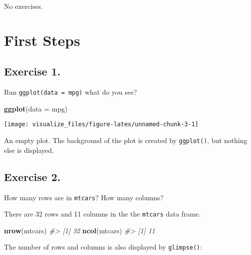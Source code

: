 \documentclass[]{book}
\newenvironment{Shaded}{\begin{snugshade}}{\end{snugshade}}
\newcommand{\CommentTok}[1]{\textcolor[rgb]{0.56,0.35,0.01}{\textit{#1}}}
\newcommand{\DataTypeTok}[1]{\textcolor[rgb]{0.13,0.29,0.53}{#1}}
\newcommand{\KeywordTok}[1]{\textcolor[rgb]{0.13,0.29,0.53}{\textbf{#1}}}
\newcommand{\NormalTok}[1]{#1}
\theoremstyle{definition}
\theoremstyle{definition}
\theoremstyle{definition}
\theoremstyle{remark}
\begin{document}
No exercises.

\hypertarget{first-steps}{%
\section{First Steps}\label{first-steps}}

\hypertarget{exercise-1.}{%
\subsection{Exercise 1.}\label{exercise-1.}}

Run \texttt{ggplot(data\ =\ mpg)} what do you see?

\begin{Shaded}
\begin{Highlighting}[]
\KeywordTok{ggplot}\NormalTok{(}\DataTypeTok{data =}\NormalTok{ mpg)}
\end{Highlighting}
\end{Shaded}

\begin{center}\texttt{[image: visualize\_files/figure-latex/unnamed-chunk-3-1]} \end{center}

An empty plot. The background of the plot is created by
\texttt{ggplot()}, but nothing else is displayed.

\hypertarget{exercise-2.}{%
\subsection{Exercise 2.}\label{exercise-2.}}

How many rows are in \texttt{mtcars}? How many columns?

There are 32 rows and 11 columns in the the \texttt{mtcars} data frame.

\begin{Shaded}
\begin{Highlighting}[]
\KeywordTok{nrow}\NormalTok{(mtcars)}
\CommentTok{#> [1] 32}
\KeywordTok{ncol}\NormalTok{(mtcars)}
\CommentTok{#> [1] 11}
\end{Highlighting}
\end{Shaded}

The number of rows and columns is also displayed by \texttt{glimpse()}:
\end{document}
